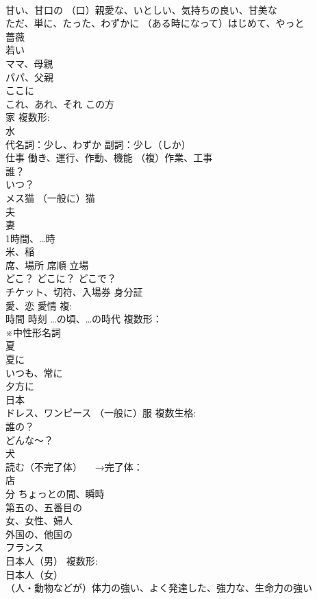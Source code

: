 \documentclass[8pt]{extreport}
\begin{document}
\begin{CJK}{UTF8}{min}
\\	甘い、甘口の （口）親愛な、いとしい、気持ちの良い、甘美な
\\	ただ、単に、たった、わずかに （ある時になって）はじめて、やっと
\\	薔薇
\\	若い
\\	ママ、母親
\\	パパ、父親
\\	ここに
\\	これ、あれ、それ この方
\\	家 複数形:
\\	水
\\	代名詞：少し、わずか 副詞：少し（しか）
\\	仕事 働き、運行、作動、機能 （複）作業、工事
\\	誰？
\\	いつ？
\\	メス猫 （一般に）猫
\\	夫
\\	妻
\\	1時間、…時
\\	米、稲
\\	席、場所 席順 立場
\\	どこ？ どこに？ どこで？
\\	チケット、切符、入場券 身分証
\\	愛、恋 愛情 複:
\\	時間 時刻 …の頃、…の時代 複数形：
\\	※中性形名詞
\\	夏
\\	夏に
\\	いつも、常に
\\	夕方に
\\	日本
\\	ドレス、ワンピース （一般に）服 複数生格:
\\	誰の？
\\	どんな～？
\\	犬
\\	読む（不完了体） 　→完了体：
\\	店
\\	分 ちょっとの間、瞬時
\\	[序]第五の、五番目の
\\	女、女性、婦人
\\	外国の、他国の
\\	フランス
\\	日本人（男） 複数形:
\\	日本人（女）
\\	（人・動物などが）体力の強い、よく発達した、強力な、生命力の強い

\end{CJK}
\end{document}
